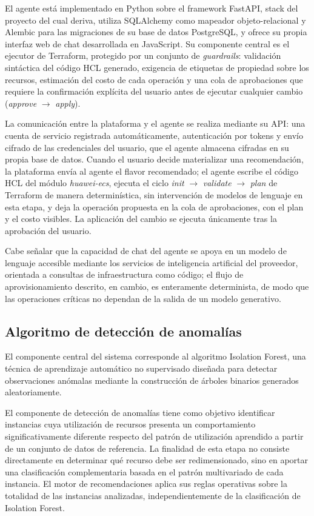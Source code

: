 El agente está implementado en Python sobre el framework FastAPI, stack del proyecto del cual deriva, utiliza SQLAlchemy como mapeador objeto-relacional y Alembic para las migraciones de su base de datos PostgreSQL, y ofrece su propia interfaz web de chat desarrollada en JavaScript. Su componente central es el ejecutor de Terraform, protegido por un conjunto de \emph{guardrails}: validación sintáctica del código HCL generado, exigencia de etiquetas de propiedad sobre los recursos, estimación del costo de cada operación y una cola de aprobaciones que requiere la confirmación explícita del usuario antes de ejecutar cualquier cambio (\emph{approve} $\rightarrow$ \emph{apply}).

La comunicación entre la plataforma y el agente se realiza mediante su API: una cuenta de servicio registrada automáticamente, autenticación por tokens y envío cifrado de las credenciales del usuario, que el agente almacena cifradas en su propia base de datos. Cuando el usuario decide materializar una recomendación, la plataforma envía al agente el flavor recomendado; el agente escribe el código HCL del módulo \emph{huawei-ecs}, ejecuta el ciclo \emph{init} $\rightarrow$ \emph{validate} $\rightarrow$ \emph{plan} de Terraform de manera determinística, sin intervención de modelos de lenguaje en esta etapa, y deja la operación propuesta en la cola de aprobaciones, con el plan y el costo visibles. La aplicación del cambio se ejecuta únicamente tras la aprobación del usuario.

Cabe señalar que la capacidad de chat del agente se apoya en un modelo de lenguaje accesible mediante los servicios de inteligencia artificial del proveedor, orientada a consultas de infraestructura como código; el flujo de aprovisionamiento descrito, en cambio, es enteramente determinista, de modo que las operaciones críticas no dependan de la salida de un modelo generativo.

\subsection{Algoritmo de detección de anomalías}\label{sec:algoritmo}

El componente central del sistema corresponde al algoritmo Isolation
Forest, una técnica de aprendizaje automático no supervisado diseñada
para detectar observaciones anómalas mediante la construcción de árboles
binarios generados aleatoriamente.

El componente de detección de anomalías tiene como objetivo identificar
instancias cuya utilización de recursos presenta un comportamiento
significativamente diferente respecto del patrón de utilización
aprendido a partir de un conjunto de datos de referencia. La finalidad
de esta etapa no consiste directamente en determinar qué recurso debe
ser redimensionado, sino en aportar una clasificación complementaria
basada en el patrón multivariado de cada instancia. El motor de
recomendaciones aplica sus reglas operativas sobre la totalidad de las
instancias analizadas, independientemente de la clasificación de
Isolation Forest.


